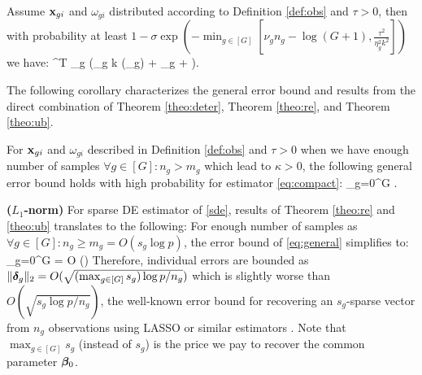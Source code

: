 \begin{theorem}
	\label{theo:ub}
	Assume $\mathbf{x}_{gi}$ and $\omega_{gi}$ distributed according to Definition \ref{def:obs} and $\tau > 0$, then with probability at least  $1 - \sigma \exp\left(-\min_{g \in [G]}\left[\nu_g  n_g - \log (G+1), \frac{\tau^2}{\eta_g^2 k^2}\right]\right) $  we have:
	{\small
	\be
	\nr
	 \oomega ^T \X\ddelta
	\leq {} \max_{g \in [G]} \left(\zeta_g k \omega(\cA_g) + \epsilon_g + \tau \right). \nr
	\ee
	}
\end{theorem}

The following corollary characterizes the general error bound and results from the direct combination of Theorem \ref{theo:deter}, Theorem \ref{theo:re}, and Theorem \ref{theo:ub}.
\begin{corollary}
	\label{corr:calcub}
	For $\mathbf{x}_{gi}$ and $\omega_{gi}$ described in Definition \ref{def:obs} and $\tau > 0$ when we have enough number of samples $\forall g \in [G]: n_g > m_g$ which lead to $\kappa > 0$, the following general error bound holds with high probability for estimator \eqref{eq:compact}:
	{\small\be
	\label{eq:general}
	\sum_{g=0}^{G}  
	\leq {\gamma} .
	\ee	}
\end{corollary}
\begin{example}
	{\bf ($L_1$-norm)} For sparse DE estimator of \eqref{sde}, results of Theorem \ref{theo:re} and \ref{theo:ub} translates to the following: For enough number of samples as $\forall g \in [G]: n_g \geq m_g = O(s_g \log p)$, the error bound of \eqref{eq:general} simplifies to:
	\be
	\sum_{g=0}^{G}  	= O \left(\right) %
	\ee 
	Therefore, individual errors are bounded as $\|\boldsymbol{\delta}_g\|_{2}	= O (\sqrt{(\max_{g \in [G]}  s_g)\log p/n_g})$
	which is slightly worse than $O(\sqrt{s_g\log p/n_g})$, the well-known error bound for recovering an $s_g$-sparse vector from $n_g$ observations using LASSO or similar estimators \cite{banerjee14, venkat12, candes2007dantzig, chatterjee2014generalized, bickel2009simultaneous}. Note that $\max_{g \in [G]}  s_g$ (instead of $s_g$) is the price we pay to recover the common parameter $\boldsymbol{\beta}_0$. 
\end{example}

